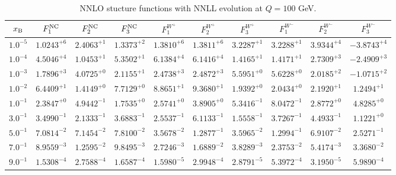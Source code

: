 \begin{table}[h]
\begin{adjustbox}{width=\textwidth}
\begin{tabular}{|c||c|c|c|c|c|c|c|c|c|}
\hline
$x_{\rm B}$ & $F_1^{\rm NC}$ & $F_2^{\rm NC}$ & $F_3^{\rm NC}$ & $F_1^{W^+}$ & $F_2^{W^+}$ & $F_3^{W^+}$ & $F_1^{W^-}$ & $F_2^{W^-}$ & $F_3^{W^-}$ \\
\hline
$ 1.0^{-5}$ & $ 1.0243^{+6}$ & $ 2.4063^{+1}$ & $ 1.3373^{+2}$ & $ 1.3810^{+6}$ & $ 1.3811^{+6}$ & $ 3.2287^{+1}$ & $ 3.2288^{+1}$ & $ 3.9344^{+4}$ & $-3.8743^{+4}$ \\
$ 1.0^{-4}$ & $ 4.5046^{+4}$ & $ 1.0453^{+1}$ & $ 5.3502^{+1}$ & $ 6.1384^{+4}$ & $ 6.1416^{+4}$ & $ 1.4165^{+1}$ & $ 1.4171^{+1}$ & $ 2.7309^{+3}$ & $-2.4909^{+3}$ \\
$ 1.0^{-3}$ & $ 1.7896^{+3}$ & $ 4.0725^{+0}$ & $ 2.1155^{+1}$ & $ 2.4738^{+3}$ & $ 2.4872^{+3}$ & $ 5.5951^{+0}$ & $ 5.6228^{+0}$ & $ 2.0185^{+2}$ & $-1.0715^{+2}$ \\
$ 1.0^{-2}$ & $ 6.4409^{+1}$ & $ 1.4149^{+0}$ & $ 7.7129^{+0}$ & $ 8.8651^{+1}$ & $ 9.3680^{+1}$ & $ 1.9392^{+0}$ & $ 2.0434^{+0}$ & $ 2.1920^{+1}$ & $ 1.2494^{+1}$ \\
$ 1.0^{-1}$ & $ 2.3847^{+0}$ & $ 4.9442^{-1}$ & $ 1.7535^{+0}$ & $ 2.5741^{+0}$ & $ 3.8905^{+0}$ & $ 5.3416^{-1}$ & $ 8.0472^{-1}$ & $ 2.8772^{+0}$ & $ 4.8285^{+0}$ \\
$ 3.0^{-1}$ & $ 3.4990^{-1}$ & $ 2.1333^{-1}$ & $ 3.6883^{-1}$ & $ 2.5537^{-1}$ & $ 6.1133^{-1}$ & $ 1.5558^{-1}$ & $ 3.7267^{-1}$ & $ 4.4933^{-1}$ & $ 1.1221^{+0}$ \\
$ 5.0^{-1}$ & $ 7.0814^{-2}$ & $ 7.1454^{-2}$ & $ 7.8100^{-2}$ & $ 3.5678^{-2}$ & $ 1.2877^{-1}$ & $ 3.5965^{-2}$ & $ 1.2994^{-1}$ & $ 6.9107^{-2}$ & $ 2.5271^{-1}$ \\
$ 7.0^{-1}$ & $ 8.9559^{-3}$ & $ 1.2595^{-2}$ & $ 9.8495^{-3}$ & $ 2.7246^{-3}$ & $ 1.6889^{-2}$ & $ 3.8289^{-3}$ & $ 2.3753^{-2}$ & $ 5.4174^{-3}$ & $ 3.3680^{-2}$ \\
$ 9.0^{-1}$ & $ 1.5308^{-4}$ & $ 2.7588^{-4}$ & $ 1.6587^{-4}$ & $ 1.5980^{-5}$ & $ 2.9948^{-4}$ & $ 2.8791^{-5}$ & $ 5.3972^{-4}$ & $ 3.1950^{-5}$ & $ 5.9890^{-4}$ \\
\hline
\end{tabular}
\end{adjustbox}\caption{NNLO stucture functions with NNLL evolution at $Q = 100$ GeV.}
\label{tab:N2LO-Q100}
\end{table}


